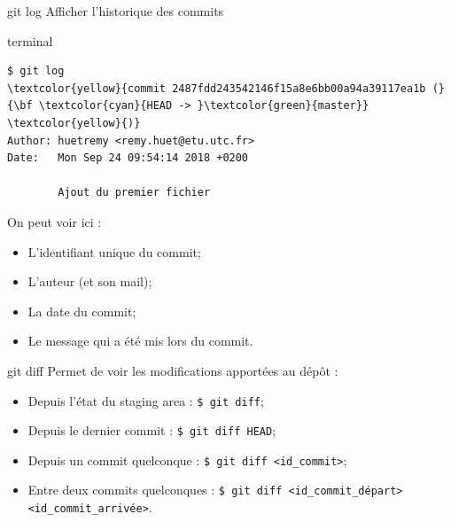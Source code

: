 \documentclass[usepdftitle=false]{beamer}
\def\seplength{.3\topsep}
\newcommand{\Pause}{%
\ifdef{\Release}
  {\pause}
  {}
}
\begin{document}
\begin{frame}[fragile]{git log}
	Afficher l'historique des commits
	\begin{beamercolorbox}[rounded=true,shadow=true]{terminal}
		\vspace{-\seplength}
		\begin{Verbatim}
$ git log
\textcolor{yellow}{commit 2487fdd243542146f15a8e6bb00a94a39117ea1b (}{\bf \textcolor{cyan}{HEAD -> }\textcolor{green}{master}} \textcolor{yellow}{)}
Author: huetremy <remy.huet@etu.utc.fr>
Date:   Mon Sep 24 09:54:14 2018 +0200

    	Ajout du premier fichier
		\end{Verbatim}
	\end{beamercolorbox}
	\Pause
	On peut voir ici : \Pause
	\begin{itemize}
		\item L'identifiant unique du commit; \Pause
		\item L'auteur (et son mail); \Pause
		\item La date du commit; \Pause
		\item Le message qui a été mis lors du commit.
	\end{itemize}
\end{frame}

\begin{frame}[fragile]{git diff}
	Permet de voir les modifications apportées au dépôt :
	\begin{itemize}
		\item Depuis l'état du staging area : \verb+$ git diff+;
		\item Depuis le dernier commit : \verb+$ git diff HEAD+;
		\item Depuis un commit quelconque : \verb+$ git diff <id_commit>+;
		\item Entre deux commits quelconques : \verb+$ git diff <id_commit_départ> <id_commit_arrivée>+.
	\end{itemize}
\end{frame}
\end{document}
